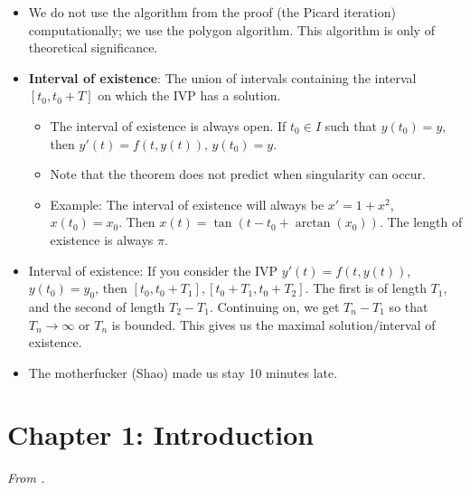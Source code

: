 \documentclass[../notes.tex]{subfiles}
\begin{document}
\begin{itemize}
\begin{itemize}
    \end{itemize}
    \item We do not use the algorithm from the proof (the Picard iteration) computationally; we use the polygon algorithm. This algorithm is only of theoretical significance.
    \item \textbf{Interval of existence}: The union of intervals containing the interval $[t_0,t_0+T]$ on which the IVP has a solution.
    \begin{itemize}
        \item The interval of existence is always open. If $t_0\in I$ such that $y(t_0)=y$, then $y'(t)=f(t,y(t))$, $y(t_0)=y$.
        \item Note that the theorem does not predict when singularity can occur.
        \item Example: The interval of existence will always be $x'=1+x^2$, $x(t_0)=x_0$. Then $x(t)=\tan(t-t_0+\arctan(x_0))$. The length of existence is always $\pi$.
    \end{itemize}
    \item Interval of existence: If you consider the IVP $y'(t)=f(t,y(t))$, $y(t_0)=y_0$, then $[t_0,t_0+T_1],[t_0+T_1,t_0+T_2]$. The first is of length $T_1$, and the second of length $T_2-T_1$. Continuing on, we get $T_n-T_1$ so that $T_n\to\infty$ or $T_n$ is bounded. This gives us the maximal solution/interval of existence.
    \item The motherfucker (Shao) made us stay 10 minutes late.
\end{itemize}



\section{Chapter 1: Introduction}
\emph{From \textcite{bib:Teschl}.}
\end{document}
